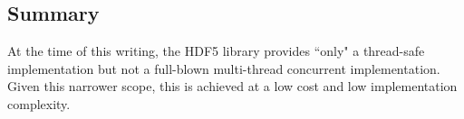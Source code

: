 

\subsection{Summary}

At the time of this writing, the HDF5 library provides ``only" a thread-safe implementation but not a full-blown multi-thread concurrent implementation. Given this narrower scope, this is achieved at a low cost and low implementation complexity.
